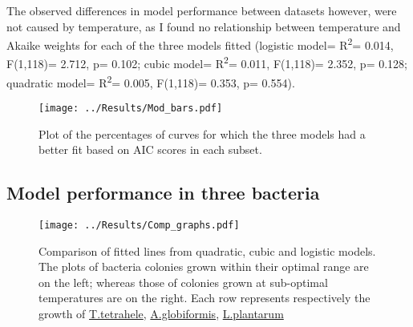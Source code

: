 \documentclass[a4paper]{article}
\begin{document}
The observed differences in model performance between datasets however, were not caused by temperature, as I found no relationship between temperature and Akaike weights for each of the three models fitted (logistic model= R\textsuperscript{2}= 0.014, F(1,118)= 2.712, p= 0.102; cubic model=  R\textsuperscript{2}= 0.011, F(1,118)= 2.352, p= 0.128; quadratic model= R\textsuperscript{2}= 0.005, F(1,118)= 0.353, p= 0.554). 
 
\begin{figure}
    \centering
    \texttt{[image: ../Results/Mod\_bars.pdf]}
\caption{Plot of the percentages of curves for which the three models had a better fit based on AIC scores in each subset. }
    \label{fig:modbarplots}
\end{figure}

    \subsection{Model performance in three bacteria}
\begin{figure}
    \centering
    \texttt{[image: ../Results/Comp\_graphs.pdf]}
    \caption{Comparison of fitted lines from quadratic, cubic and logistic models. The plots of bacteria colonies grown within their optimal range are on the left; whereas those of colonies grown at sub-optimal temperatures are on the right. Each row represents respectively the growth of \underline{T.tetrahele}, \underline{A.globiformis}, \underline{L.plantarum} }
    \label{fig:comparisons}
\end{figure}
\end{document}

